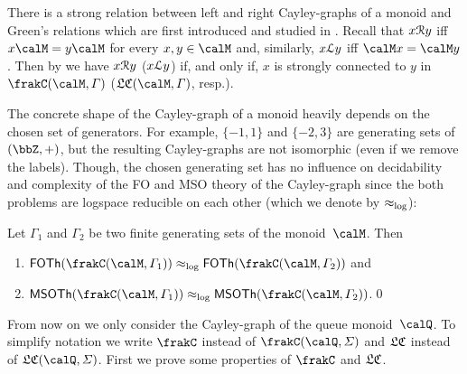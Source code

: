 \begin{remark}
	There is a strong relation between left and right Cayley-graphs of a monoid and Green's relations which are first introduced and studied in \cite{Gre51}. Recall that $x\mathcal{R} y$ iff $x\calM=y\calM$ for every $x,y\in\calM$ and, similarly, $x\mathcal{L} y$ iff $\calM x=\calM y$. Then by \cite[Proposition V.1.1]{pin2010} we have $x\mathcal{R} y$ ($x\mathcal{L} y$) if, and only if, $x$ is strongly connected to $y$ in $\cayley{\calM}{\varGamma}$ ($\lcayley{\calM}{\varGamma}$, resp.).
\end{remark}

The concrete shape of the Cayley-graph of a monoid heavily depends on the chosen set of generators. For example, $\{-1,1\}$ and $\{-2,3\}$ are generating sets of $(\bbZ,+)$, but the resulting Cayley-graphs are not isomorphic (even if we remove the labels). Though, the chosen generating set has no influence on decidability and complexity of the FO and MSO theory of the Cayley-graph since the both problems are logspace reducible on each other (which we denote by $\approx_{\operatorname{log}}$):

\begin{proposition}
	Let $\varGamma_1$ and $\varGamma_2$ be two finite generating sets of the monoid~$\calM$. Then
	\begin{enumerate}[(1)]
		\item $\FOTh{\cayley{\calM}{\varGamma_1}}\eqlog\FOTh{\cayley{\calM}{\varGamma_2}}$ and
		\item $\MSOTh{\cayley{\calM}{\varGamma_1}}\eqlog\MSOTh{\cayley{\calM}{\varGamma_2}}$.\qed
	\end{enumerate}
\end{proposition}

From now on we only consider the Cayley-graph of the queue monoid~$\Qx$. To simplify notation we write $\cQ$ instead of $\cayley{\Qx}{\varSigma}$ and $\mathfrak{LC}$ instead of $\lcayley{\Qx}{\varSigma}$. First we prove some properties of $\cQ$ and $\mathfrak{LC}$.

